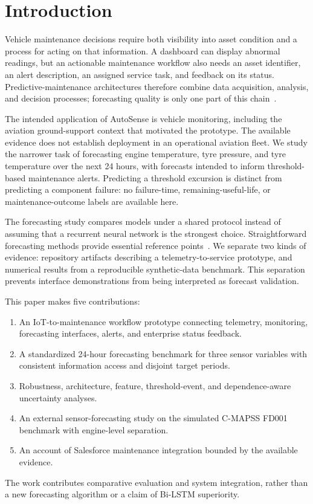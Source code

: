 \documentclass[conference]{IEEEtran}
\begin{document}
\section{Introduction}
Vehicle maintenance decisions require both visibility into asset condition and a process for acting on that information. A dashboard can display abnormal readings, but an actionable maintenance workflow also needs an asset identifier, an alert description, an assigned service task, and feedback on its status. Predictive-maintenance architectures therefore combine data acquisition, analysis, and decision processes; forecasting quality is only one part of this chain~\cite{zhu2024}.

The intended application of AutoSense is vehicle monitoring, including the aviation ground-support context that motivated the prototype. The available evidence does not establish deployment in an operational aviation fleet. We study the narrower task of forecasting engine temperature, tyre pressure, and tyre temperature over the next 24 hours, with forecasts intended to inform threshold-based maintenance alerts. Predicting a threshold excursion is distinct from predicting a component failure: no failure-time, remaining-useful-life, or maintenance-outcome labels are available here.

The forecasting study compares models under a shared protocol instead of assuming that a recurrent neural network is the strongest choice. Straightforward forecasting methods provide essential reference points~\cite{hyndman2021}. We separate two kinds of evidence: repository artifacts describing a telemetry-to-service prototype, and numerical results from a reproducible synthetic-data benchmark. This separation prevents interface demonstrations from being interpreted as forecast validation.

This paper makes five contributions:
\begin{enumerate}
\item An IoT-to-maintenance workflow prototype connecting telemetry, monitoring, forecasting interfaces, alerts, and enterprise status feedback.
\item A standardized 24-hour forecasting benchmark for three sensor variables with consistent information access and disjoint target periods.
\item Robustness, architecture, feature, threshold-event, and dependence-aware uncertainty analyses.
\item An external sensor-forecasting study on the simulated C-MAPSS FD001 benchmark with engine-level separation.
\item An account of Salesforce maintenance integration bounded by the available evidence.
\end{enumerate}
The work contributes comparative evaluation and system integration, rather than a new forecasting algorithm or a claim of Bi-LSTM superiority.
\end{document}
